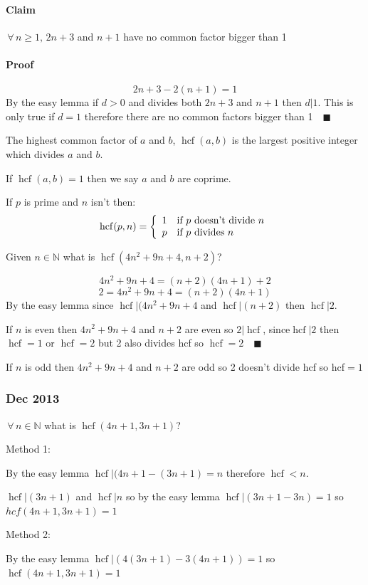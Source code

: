 \documentclass{article}
\newcommand{\bb}[1]{\mathbb{#1}}
\newcommand{\A}{\,\forall\,}
\newcommand{\hcf}{\operatorname{hcf}}
\begin{document}
\paragraph{Claim} \(\A n\ge 1,\,2n+3\) and \(n+1\) have no common factor bigger than 1

\paragraph{Proof} 
\[2n+3-2(n+1)=1\]
By the easy lemma if \(d>0\) and divides both \(2n+3\) and \(n+1\) then \(d|1\). This is only true if \(d=1\) therefore there are no common factors bigger than 1\(\quad\blacksquare\)

The highest common factor of \(a\) and \(b\), \(\hcf(a,b)\) is the largest positive integer which divides \(a\) and \(b\).

If \(\hcf(a,b)=1\) then we say \(a\) and \(b\) are coprime.

If \(p\) is prime and \(n\) isn't then:
\[\hcf(p,n)=\left\{
\begin{array}{l l}
1 & \text{if \(p\) doesn't divide \(n\)}\\
p & \text{if \(p\) divides \(n\)}
\end{array}
\right.\]

Given \(n\in\bb N\)  what is \(\hcf(4n^2+9n+4,n+2)\)?

\[4n^2+9n+4=(n+2)(4n+1)+2\]
\[2=4n^2+9n+4=(n+2)(4n+1)\]
By the easy lemma since \(\hcf|(4n^2+9n+4\) and \(\hcf|(n+2)\) then \(\hcf|2\).

If \(n\) is even then \(4n^2+9n+4\) and \(n+2\) are even so \(2|\hcf\), since\(\hcf|2\) then \(\hcf=1\) or \(\hcf=2\) but 2 also divides hcf so \(\hcf=2\quad\blacksquare\)

If \(n\) is odd then \(4n^2+9n+4\) and \(n+2\) are odd so 2 doesn't divide hcf so hcf\(=1\)

\subsubsection*{Dec 2013}

\(\A n\in\bb N\) what is \(\hcf(4n+1,3n+1)\)?

Method 1:

By the easy lemma \(\hcf|(4n+1-(3n+1)=n\) therefore \(\hcf<n\).

\(\hcf|(3n+1)\) and \(\hcf|n\) so by the easy lemma \(\hcf|(3n+1-3n)=1\) so \(hcf(4n+1,3n+1)=1\)

Method 2:

By the easy lemma \(\hcf|(4(3n+1)-3(4n+1))=1\) so \(\hcf(4n+1, 3n+1)=1\)
\end{document}

